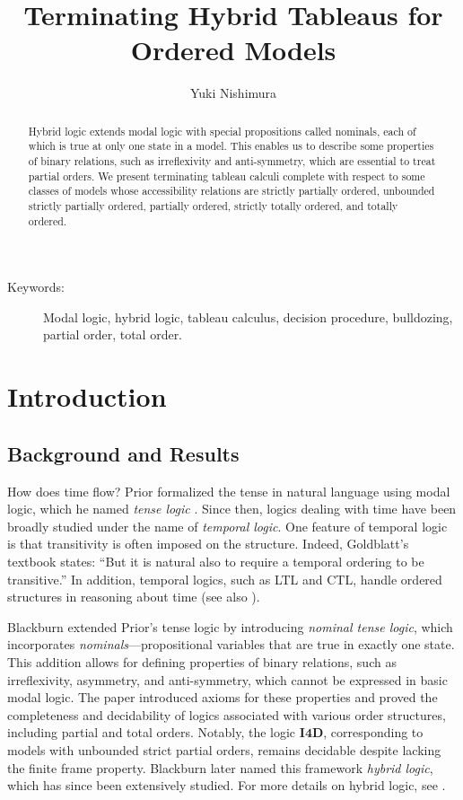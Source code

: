 \documentclass{article}
\title{Terminating Hybrid Tableaus for Ordered Models}
\author{Yuki Nishimura}
\date{ }
\theoremstyle{definition}
\begin{document}
\maketitle

\begin{abstract}
    Hybrid logic extends modal logic with special propositions called nominals, each of which is true at only one state in a model. This enables us to describe some properties of binary relations, such as irreflexivity and anti-symmetry, which are essential to treat partial orders. We present terminating tableau calculi complete with respect to some classes of models whose accessibility relations are strictly partially ordered, unbounded strictly partially ordered, partially ordered, strictly totally ordered, and totally ordered.
\end{abstract}

{ \small
\begin{description}
    \item[Keywords:] Modal logic, hybrid logic, tableau calculus, decision procedure, bulldozing, partial order, total order.
\end{description}
}

\section{Introduction}

\subsection{Background and Results}

How does time flow? Prior formalized the tense in natural language using modal logic, which he named \emph{tense logic} \cite{prior1957}. Since then, logics dealing with time have been broadly studied under the name of \emph{temporal logic}. One feature of temporal logic is that transitivity is often imposed on the structure. Indeed, Goldblatt's textbook \cite{goldblatt1992} states: ``But it is natural also to require a temporal ordering to be transitive.'' In addition, temporal logics, such as LTL and CTL, handle ordered structures in reasoning about time (see also \cite{demri2016, SEPtemporal}).

Blackburn \cite{blackburn1993} extended Prior's tense logic by introducing \emph{nominal tense logic}, which incorporates \emph{nominals}---propositional variables that are true in exactly one state. This addition allows for defining properties of binary relations, such as irreflexivity, asymmetry, and anti-symmetry, which cannot be expressed in basic modal logic. The paper introduced axioms for these properties and proved the completeness and decidability of logics associated with various order structures, including partial and total orders. Notably, the logic $\mathbf{I4D}$, corresponding to models with unbounded strict partial orders, remains decidable despite lacking the finite frame property. Blackburn later named this framework \emph{hybrid logic}, which has since been extensively studied. For more details on hybrid logic, see \cite{blackburn2000, blackburn2006P, areces2007_14, indrzejczak2007, brauner2011}.
\end{document}

